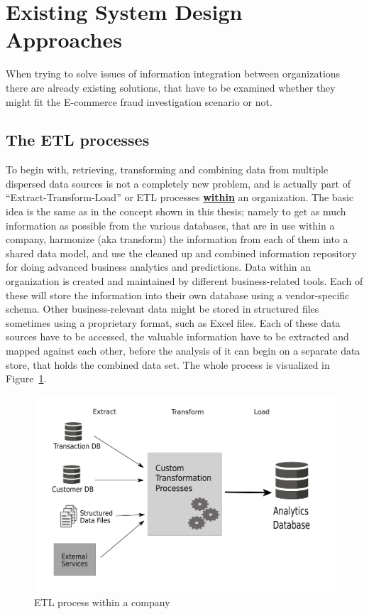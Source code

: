 
\section{Existing System Design Approaches}
\label{sec:system_approaches}

When trying to solve issues of information integration between organizations there are already existing solutions, that have to be examined whether they might fit the \gls{E-commerce} fraud investigation scenario or not.

\subsection{The \gls{ETL} processes}
\label{subsec:etl_process}

To begin with, retrieving, transforming and combining data from multiple dispersed data sources is not a completely new problem, and is actually part of ``Extract-Transform-Load'' or \gls{ETL} processes \textbf{\underline{within}} an organization. The basic idea is the same as in the concept shown in this thesis; namely to get as much information as possible from the various databases, that are in use within a company, harmonize (aka transform) the information from each of them into a shared data model, and use the cleaned up and combined information repository for doing advanced business analytics and predictions. Data within an organization is created and maintained by different business-related tools. Each of these will store the information into their own database using a vendor-specific schema. Other business-relevant data might be stored in structured files sometimes using a proprietary format, such as Excel files. Each of these data sources have to be accessed, the valuable information have to be extracted and mapped against each other, before the analysis of it can begin on a separate data store, that holds the combined data set. The whole process is visualized in Figure~\ref{fig:images_etl_process}. \\

\begin{figure}[!ht]
  \centering
  \includegraphics[width=0.9\columnwidth]{images/etl_process.pdf}
  \caption{\gls{ETL} process within a company \citep[pg. 165]{wood2014linked}}
\label{fig:images_etl_process}
\end{figure}

